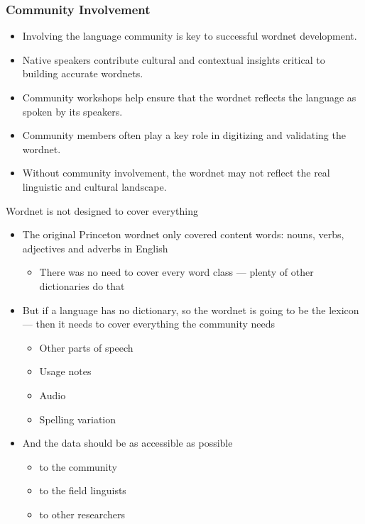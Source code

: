 \documentclass[xetex]{beamer}  %
\begin{document}
\begin{frame}
\frametitle{Community Involvement}

\begin{itemize}
    \item Involving the language community is key to successful wordnet development.
    \item Native speakers contribute cultural and contextual insights critical to building accurate wordnets.
    \item Community workshops help ensure that the wordnet reflects the language as spoken by its speakers.
    \item Community members often play a key role in digitizing and validating the wordnet.
    \item Without community involvement, the wordnet may not reflect the real linguistic and cultural landscape.
\end{itemize}
\end{frame}

\begin{frame}{Wordnet is not designed to cover everything}

  \begin{itemize}
  \item The original Princeton wordnet only covered content words: nouns, verbs, adjectives and adverbs in English
    \begin{itemize}
    \item There was no need to cover every word class --- plenty of other dictionaries do that
    \end{itemize}
  \item But if a language has no dictionary, so the wordnet is going to be the  lexicon --- then it needs to cover everything the community needs
      \begin{itemize}
      \item Other parts of speech
      \item Usage notes
      \item Audio
      \item Spelling variation
      \end{itemize}
    \item And the data should be as accessible as possible
      \begin{itemize}
      \item to the community
      \item to the field linguists
      \item to other researchers
      \end{itemize}
  \end{itemize}
  
\end{frame}
\end{document}

